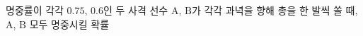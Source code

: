 명중률이 각각 $0.75$, $0.6$인 두 사격 선수 $\mathrm{A}$, $\mathrm{B}$가 각각 과녁을 향해 총을 한 발씩 쏠 때, $\mathrm{A}$, $\mathrm{B}$ 모두 명중시킬 확률
